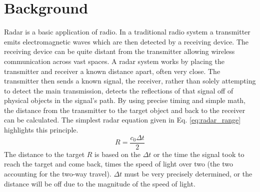 \chapter{Background}
\label{ch:background}

Radar is a basic application of radio.
In a traditional radio system a transmitter emits electromagnetic waves which are then detected by a receiving device.
The receiving device can be quite distant from the transmitter allowing wireless communication across vast spaces. %
A radar system works by placing the transmitter and receiver a known distance apart, often very close.
The transmitter then sends a known signal, the receiver, rather than solely attempting to detect the main transmission,
detects the reflections of that signal off of physical objects in the signal's path.
By using precise timing and simple math, the distance from the transmitter to the target object and back to the receiver can be calculated.
The simplest radar equation given in Eq. \ref{eq:radar_range} highlights this principle.
\begin{equation} R = \frac{c_0 \Delta t }{2} \label{eq:radar_range}\end{equation}
The distance to the target $R$ is based on the $\Delta t$ or the time the signal took to reach the target and come back,
times the speed of light over two
(the two accounting for the two-way travel). $\Delta t$ must be very precisely determined,
or the distance will be off due to the magnitude of the speed of light.





